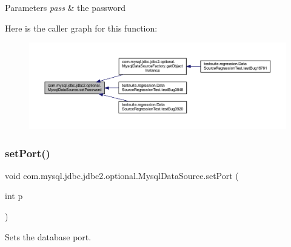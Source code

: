 \begin{DoxyParams}{Parameters}
{\em pass} & the password \\
\hline
\end{DoxyParams}
Here is the caller graph for this function\+:
\nopagebreak
\begin{figure}[H]
\begin{center}
\leavevmode
\includegraphics[width=350pt]{classcom_1_1mysql_1_1jdbc_1_1jdbc2_1_1optional_1_1_mysql_data_source_ade391cdd38bff8de57b9ef65d62200d1_icgraph}
\end{center}
\end{figure}
\mbox{\label{classcom_1_1mysql_1_1jdbc_1_1jdbc2_1_1optional_1_1_mysql_data_source_aa25877765807da50745af91b24e38da0}} 
\subsubsection{\texorpdfstring{set\+Port()}{setPort()}}
{\footnotesize\ttfamily void com.\+mysql.\+jdbc.\+jdbc2.\+optional.\+Mysql\+Data\+Source.\+set\+Port (\begin{DoxyParamCaption}\item[{int}]{p }\end{DoxyParamCaption})}

Sets the database port.


